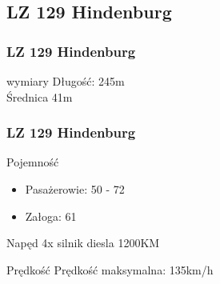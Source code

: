 \documentclass{beamer}
\begin{document}
\subsection{LZ 129 Hindenburg}
\begin{frame}
	\frametitle{LZ 129 Hindenburg}
	\begin{block}{wymiary}
	Długość: 245m\\
	Średnica 41m
	\end{block}
\end{frame}
\begin{frame}
	\frametitle{LZ 129 Hindenburg}
	\begin{block}{Pojemność}
		\begin{itemize}
			\item Pasażerowie: 50 - 72
			\item Załoga: 61
		\end{itemize}
	\end{block}
	\begin{block}{Napęd}
		4x silnik diesla 1200KM
	\end{block}
	\begin{block}{Prędkość}
		Prędkość maksymalna: 135km/h
	\end{block}
\end{frame}
\end{document}
